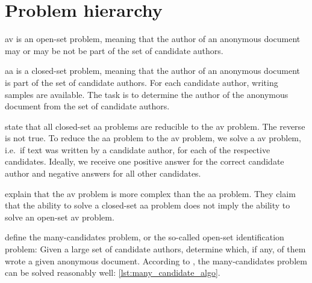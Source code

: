 \section{Problem hierarchy}
\label{sec:problem_hierarchy}


\ac{av} is an open-set problem, meaning that the author of an anonymous document 
may or may be not be part of the set of candidate authors.

\ac{aa} is a closed-set problem, meaning that the author of an anonymous document
is part of the set of candidate authors.
For each candidate author, writing samples are available.
The task is to determine the author of the anonymous document from the set of candidate authors.

\citet{koppel_determining_2014} state that all closed-set \ac{aa} problems are reducible to the \ac{av} problem.
The reverse is not true.
To reduce the \ac{aa} problem to the \ac{av} problem, we solve a \ac{av} problem, i.e.\ if text was written by a candidate author, 
for each of the respective candidates.
Ideally, we receive one positive answer for the correct candidate author and negative answers for all other candidates.

\citet{koppel_determining_2014} explain that the \ac{av} problem is more complex than the \ac{aa} problem.
They claim that the ability to solve a closed-set \ac{aa} problem does not imply the ability to solve an open-set \ac{av} problem.

\citet{koppel_determining_2014} define the many-candidates problem, or the so-called open-set identification problem:
Given a large set of candidate authors, determine which, if any, of them wrote a given anonymous document.
According to \citet{koppel_determining_2014}, the many-candidates problem can be solved reasonably well: \autoref{lst:many_candidate_algo}.

